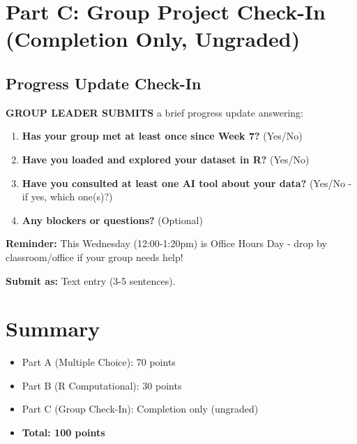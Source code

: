\documentclass[11pt]{article}
\begin{document}
\newpage

\section{Part C: Group Project Check-In (Completion Only, Ungraded)}

\subsection*{Progress Update Check-In}

\textbf{GROUP LEADER SUBMITS} a brief progress update answering:

\begin{enumerate}
\item \textbf{Has your group met at least once since Week 7?} (Yes/No)
\item \textbf{Have you loaded and explored your dataset in R?} (Yes/No)
\item \textbf{Have you consulted at least one AI tool about your data?} (Yes/No - if yes, which one(s)?)
\item \textbf{Any blockers or questions?} (Optional)
\end{enumerate}

\textbf{Reminder:} This Wednesday (12:00-1:20pm) is Office Hours Day - drop by classroom/office if your group needs help!

\textbf{Submit as:} Text entry (3-5 sentences).

\vspace{12pt}

\section*{Summary}

\begin{itemize}
\item Part A (Multiple Choice): 70 points
\item Part B (R Computational): 30 points
\item Part C (Group Check-In): Completion only (ungraded)
\item \textbf{Total: 100 points}
\end{itemize}
\end{document}

